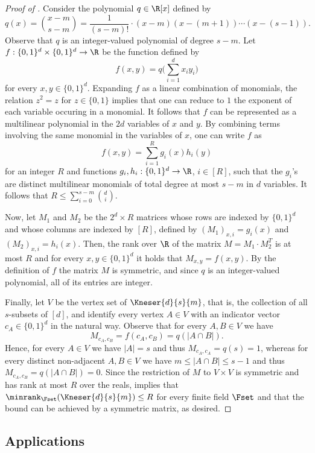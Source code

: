 \begin{proof}[Proof of ]
Consider the polynomial $q \in \R[x]$ defined by
\[q(x) = {\binom {x-m} {s-m}} = \frac{1}{(s-m)!} \cdot (x-m)(x-(m+1)) \cdots (x-(s-1)).\]
Observe that $q$ is an integer-valued polynomial of degree $s-m$.
%
%
Let $f: \{0,1\}^d \times \{0,1\}^d \rightarrow \R$ be the function defined by
\[ f(x,y) = q  \Big ( \sum_{i=1}^{d}{x_i y_i}\Big )\]
for every $x,y \in \{0,1\}^d$.
Expanding $f$ as a linear combination of monomials, the relation $z^2 = z$ for $z \in \{0,1\}$ implies that one can reduce to $1$ the exponent of each variable occuring in a monomial. It follows that $f$ can be represented as a multilinear polynomial in the $2d$ variables of $x$ and $y$. By combining terms involving the same monomial in the variables of $x$, one can write $f$ as
\[ f(x,y) = \sum_{i=1}^{R}{g_i(x) h_i(y)} \]
for an integer $R$ and functions $g_i, h_i : \{0,1\}^d \rightarrow \R$, $i \in [R]$, such that the $g_i$'s are distinct multilinear monomials of total degree at most $s-m$ in $d$ variables. It follows that $R \leq \sum_{i=0}^{s-m}\binom{d}{i}$.

Now, let $M_1$ and $M_2$ be the $2^d \times R$ matrices whose rows are indexed by $\{0,1\}^d$ and whose columns are indexed by $[R]$, defined by $(M_1)_{x,i} = g_i(x)$ and $(M_2)_{x,i} = h_i(x)$. Then, the rank over $\R$ of the matrix $M = M_1 \cdot M_2^T$ is at most $R$ and for every $x,y \in\{0,1\}^d$ it holds that $M_{x,y} = f(x,y)$. By the definition of $f$ the matrix $M$ is symmetric, and since $q$ is an integer-valued polynomial, all of its entries are integer.

Finally, let $V$ be the vertex set of $\Kneser{d}{s}{m}$, that is, the collection of all $s$-subsets of $[d]$, and identify every vertex $A \in V$ with an indicator vector $c_A \in \{0,1\}^d$ in the natural way.
Observe that for every $A,B \in V$ we have
\[M_{c_A, c_B} = f(c_A,c_B) = q(|A \cap B|).\]
Hence, for every $A \in V$ we have $|A|=s$ and thus $M_{c_A,c_A} =q(s) = 1$, whereas for every distinct non-adjacent $A,B \in V$ we have $m \leq |A \cap B|\leq s-1$ and thus $M_{c_A,c_B} = q(|A \cap B|) =0$.
Since the restriction of $M$ to $V \times V$ is symmetric and has rank at most $R$ over the reals,  implies that ${\minrank}_{\Fset}(\Kneser{d}{s}{m}) \leq R$ for every finite field $\Fset$ and that the bound can be achieved by a symmetric matrix, as desired.
\end{proof}

\subsection{Applications}

